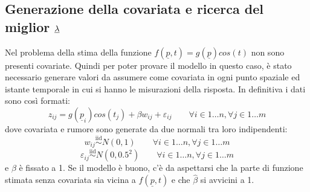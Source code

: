 \documentclass[a4paper,11pt,twoside,openright]{book}							%
\begin{document}
\subsection{Generazione della covariata e ricerca del miglior $\protect\underline{\lambda}$}
Nel problema della stima della funzione $f(\underline p,t)=g(\underline p)cos(t)$ non sono presenti covariate. Quindi per poter provare il modello in questo caso, è stato necessario generare valori da assumere come covariata in ogni punto spaziale ed istante temporale in cui si hanno le misurazioni della risposta.
In definitiva i dati sono così formati:
$$
z_{ij}=g(\underline p_{i})cos(t_j) + \beta w_{ij} + \varepsilon_{ij} \qquad \forall i \in 1\ldots n, \forall j \in 1\ldots m
$$
dove covariata e rumore sono generate da due normali tra loro indipendenti:
$$
w_{ij}\stackrel{\mathrm{iid}}{\sim}N(0,1) \qquad \forall i \in 1\ldots n, \forall j \in 1\ldots m
$$
$$
\varepsilon_{ij}\stackrel{\mathrm{iid}}{\sim}N(0,0.5^2) \qquad \forall i \in 1\ldots n, \forall j \in 1\ldots m
$$
e $\beta$ è fissato a 1. Se il modello è buono, c'è da aspettarsi che la parte di funzione stimata senza covariata sia vicina a $f(\underline p,t)$ e che $\hat{\beta}$ si avvicini a 1.
 
\end{document}
